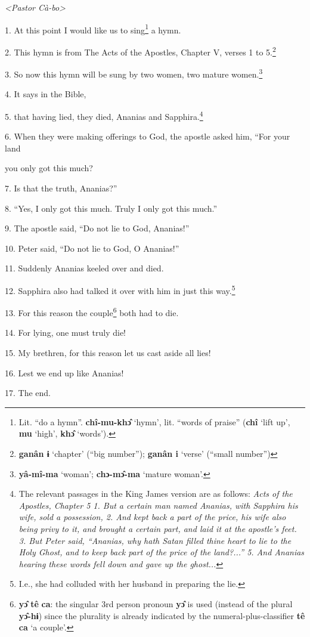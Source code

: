 \setcounter{footnote}{0}

\textit{<Pastor Cà-bo>} 

1. At this point I would like us to sing\footnote{Lit. ``do a hymn''. \textbf{chî-mu-khɔ̂} `hymn', lit. ``words of praise'' (\textbf{chî} `lift up', \textbf{mu} `high', \textbf{khɔ̂} `words').} a hymn.

2. This hymn is from The Acts of the Apostles, Chapter V, verses 1 to 5.\footnote{\textbf{ganân ɨ} `chapter' (``big number''); \textbf{ganân i} `verse' (``small number'')}

3. So now this hymn will be sung by two women, two mature women.\footnote{\textbf{yâ-mî-ma} `woman'; \textbf{chɔ-mɔ̂-ma} `mature woman'.}

\textit{}

4. It says in the Bible,

5. that having lied, they died, Ananias and Sapphira.\footnote{The relevant passages in the King James version are as follows: \textit{Acts of the Apostles, Chapter 5 1. But a certain man named Ananias, with Sapphira his wife, sold a possession, 2. And kept back a part of the price, his wife also being privy to it, and brought a certain part, and laid it at the apostle's feet. 3. But Peter said, ``Ananias, why hath Satan filled thine heart to lie to the Holy Ghost, and to keep back part of the price of the land?...'' 5. And Ananias hearing these words fell down and gave up the ghost...}}

6. When they were making offerings to God, the apostle asked him, ``For your land


you only got this much?

7. Is that the truth, Ananias?''

8. ``Yes, I only got this much. Truly I only got this much.''

9. The apostle said, ``Do not lie to God, Ananias!''

10. Peter said, ``Do not lie to God, O Ananias!''

11. Suddenly Ananias keeled over and died.

12. Sapphira also had talked it over with him in just this way.\footnote{I.e., she had colluded with her husband in preparing the lie.}

13. For this reason the couple\footnote{\textbf{yɔ̂} \textbf{tê} \textbf{ca}: the singular 3rd person pronoun \textbf{yɔ̂} is used (instead of the plural \textbf{yɔ̂-hɨ}) since the plurality is already indicated by the numeral-plus-classifier \textbf{tê} \textbf{ca} `a couple'.} both had to die.

14. For lying, one must truly die!

15. My brethren, for this reason let us cast aside all lies!

16. Lest we end up like Ananias!

17. The end.

